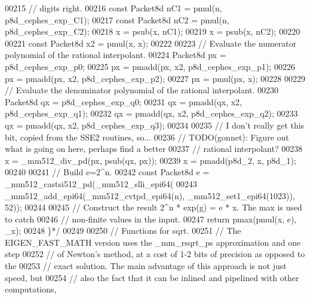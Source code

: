 \begin{DoxyCode}
00215 \textcolor{comment}{  // digits right.}
00216 \textcolor{comment}{  const Packet8d nC1 = pmul(n, p8d\_cephes\_exp\_C1);}
00217 \textcolor{comment}{  const Packet8d nC2 = pmul(n, p8d\_cephes\_exp\_C2);}
00218 \textcolor{comment}{  x = psub(x, nC1);}
00219 \textcolor{comment}{  x = psub(x, nC2);}
00220 \textcolor{comment}{}
00221 \textcolor{comment}{  const Packet8d x2 = pmul(x, x);}
00222 \textcolor{comment}{}
00223 \textcolor{comment}{  // Evaluate the numerator polynomial of the rational interpolant.}
00224 \textcolor{comment}{  Packet8d px = p8d\_cephes\_exp\_p0;}
00225 \textcolor{comment}{  px = pmadd(px, x2, p8d\_cephes\_exp\_p1);}
00226 \textcolor{comment}{  px = pmadd(px, x2, p8d\_cephes\_exp\_p2);}
00227 \textcolor{comment}{  px = pmul(px, x);}
00228 \textcolor{comment}{}
00229 \textcolor{comment}{  // Evaluate the denominator polynomial of the rational interpolant.}
00230 \textcolor{comment}{  Packet8d qx = p8d\_cephes\_exp\_q0;}
00231 \textcolor{comment}{  qx = pmadd(qx, x2, p8d\_cephes\_exp\_q1);}
00232 \textcolor{comment}{  qx = pmadd(qx, x2, p8d\_cephes\_exp\_q2);}
00233 \textcolor{comment}{  qx = pmadd(qx, x2, p8d\_cephes\_exp\_q3);}
00234 \textcolor{comment}{}
00235 \textcolor{comment}{  // I don't really get this bit, copied from the SSE2 routines, so...}
00236 \textcolor{comment}{  // TODO(gonnet): Figure out what is going on here, perhaps find a better}
00237 \textcolor{comment}{  // rational interpolant?}
00238 \textcolor{comment}{  x = \_mm512\_div\_pd(px, psub(qx, px));}
00239 \textcolor{comment}{  x = pmadd(p8d\_2, x, p8d\_1);}
00240 \textcolor{comment}{}
00241 \textcolor{comment}{  // Build e=2^n.}
00242 \textcolor{comment}{  const Packet8d e = \_mm512\_castsi512\_pd(\_mm512\_slli\_epi64(}
00243 \textcolor{comment}{      \_mm512\_add\_epi64(\_mm512\_cvtpd\_epi64(n), \_mm512\_set1\_epi64(1023)), 52));}
00244 \textcolor{comment}{}
00245 \textcolor{comment}{  // Construct the result 2^n * exp(g) = e * x. The max is used to catch}
00246 \textcolor{comment}{  // non-finite values in the input.}
00247 \textcolor{comment}{  return pmax(pmul(x, e), \_x);}
00248 \textcolor{comment}{  \}*/}
00249 
00250 \textcolor{comment}{// Functions for sqrt.}
00251 \textcolor{comment}{// The EIGEN\_FAST\_MATH version uses the \_mm\_rsqrt\_ps approximation and one step}
00252 \textcolor{comment}{// of Newton's method, at a cost of 1-2 bits of precision as opposed to the}
00253 \textcolor{comment}{// exact solution. The main advantage of this approach is not just speed, but}
00254 \textcolor{comment}{// also the fact that it can be inlined and pipelined with other computations,}

\end{DoxyCode}
